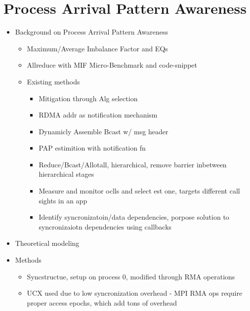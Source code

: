 
\glsresetall %
\chapter[PAPAwareness]{Process Arrival Pattern Awareness}\label{ch:PAPAwareness}

\begin{itemize}
    \item Background on Process Arrival Pattern Awareness
    \begin{itemize}
        \item Maximum/Average Imbalance Factor and EQs
        \item Allreduce with MIF Micro-Benchmark and code-snippet
        \item Existing methods
        \begin{itemize}
            \item Mitigation through Alg selection
            \item RDMA addr as notification mechanism \cite{Qian2009ProcArrivalSHMA2AIB}
            \item Dynamicly Assemble Bcast w/ msg header \cite{Patarasuk2008EffBcastDifProcArr}
            \item PAP estimition with notification fn \cite{Proficz2018ImprvAllReduceForImbPAP, Proficz2020PAPAwareScatterGather, Proficz2021AllGatherResilientToImbPAP}
            \item Reduce/Bcast/Allotall, hierarchical, remove barrier inbetween hierarchical stages \cite{Parsons2015ExpProcImbMPICollHierarcialSys}
            \item Measure and monitor oclls and select est one, targets different call sights in an app \cite{Faraj2008StudyProcArrivalMPIColl}
            \item Identify syncronizatoin/data dependencies, porpose solution to syncronizaiotn dependencies using callbacks \cite{Luo2018ADAPT}
        \end{itemize}
    \end{itemize}
    \item Theoretical modeling
    \item Methods
    \begin{itemize}
        \item Syncstructue, setup on process 0, modified through RMA operations
        \item UCX used due to low syncronization overhead - MPI RMA ops require proper access epochs, which add tons of overhead

\end{itemize}
\end{itemize}
